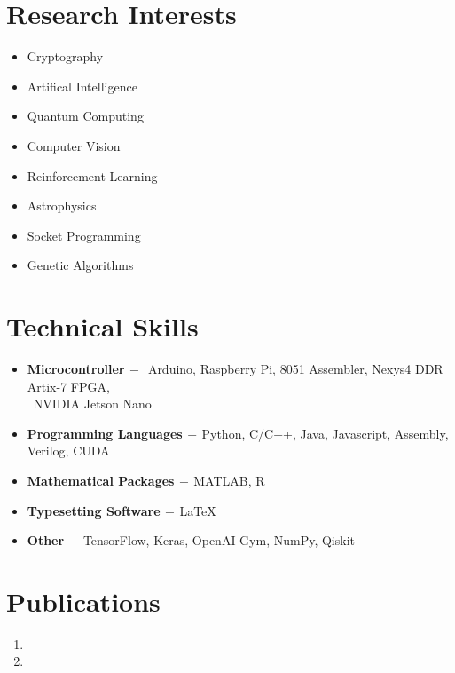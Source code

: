 \documentclass[a4paper, 12pt]{article}
\begin{document}
    \section*{Research Interests}
    \begin{multicols}{2}
    	\begin{itemize}
    		\item Cryptography
    		\item Artifical Intelligence
    		\item Quantum Computing
    		\item Computer Vision
    		\item Reinforcement Learning
    		\item Astrophysics
    		\item Socket Programming
    		\item Genetic Algorithms
    	\end{itemize}
    \end{multicols}

    \section*{Technical Skills}
	\begin{flushleft}
	    \begin{itemize}
	    	\item \textbf{Microcontroller}$\,-\,$ Arduino, Raspberry Pi, 8051 Assembler,  Nexys4 DDR Artix-7 FPGA,\\\qquad\qquad\qquad\quad\qquad\, NVIDIA Jetson Nano
	        \item \textbf{Programming Languages}$\,-\,$Python, C/C++, Java, Javascript, Assembly, Verilog, CUDA
	        \item \textbf{Mathematical Packages}$\,-\,$MATLAB, R
	        \item \textbf{Typesetting Software}$\,-\,$\LaTeX
	        \item \textbf{Other}$\,-\,$TensorFlow, Keras, OpenAI Gym, NumPy, Qiskit
	    \end{itemize}
	\end{flushleft}
	
	\section*{Publications}
  	\begin{enumerate}
  		\item {}
  		\item {}
  	\end{enumerate}
  	
\end{document}
